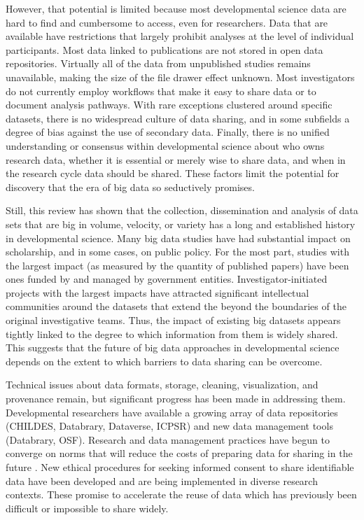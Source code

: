 \documentclass[letterpaper,man,apacite,natbib]{apa6}
\begin{document}
However, that potential is limited because most developmental science data are hard to find and cumbersome to access, even for researchers.
Data that are available have restrictions that largely prohibit analyses at the level of individual participants.
Most data linked to publications are not stored in open data repositories.
Virtually all of the data from unpublished studies remains unavailable, making the size of the file drawer effect unknown.
Most investigators do not currently employ workflows that make it easy to share data or to document analysis pathways.
With rare exceptions clustered around specific datasets, there is no widespread culture of data sharing, and in some subfields a degree of bias against the use of secondary data.
Finally, there is no unified understanding or consensus within developmental science about who owns research data, whether it is essential or merely wise to share data, and when in the research cycle data should be shared.
These factors limit the potential for discovery that the era of big data so seductively promises.

Still, this review has shown that the collection, dissemination and analysis of data sets that are big in volume, velocity, or variety has a long and established history in developmental science.
Many big data studies have had substantial impact on scholarship, and in some cases, on public policy.
For the most part, studies with the largest impact (as measured by the quantity of published papers) have been ones funded by and managed by government entities.
Investigator-initiated projects with the largest impacts have attracted significant intellectual communities around the datasets that extend the beyond the boundaries of the original investigative teams.
Thus, the impact of existing big datasets appears tightly linked to the degree to which information from them is widely shared.
This suggests that the future of big data approaches in developmental science depends on the extent to which barriers to data sharing can be overcome.

Technical issues about data formats, storage, cleaning, visualization, and provenance remain, but significant progress has been made in addressing them.
Developmental researchers have available a growing array of data repositories (CHILDES, Databrary, Dataverse, ICPSR) and new data management tools (Databrary, OSF).
Research and data management practices have begun to converge on norms that will reduce the costs of preparing data for sharing in the future \cite{goodman_ten_2014}.
New ethical procedures for seeking informed consent to share identifiable data have been developed and are being implemented in diverse research contexts.
These promise to accelerate the reuse of data which has previously been difficult or impossible to share widely.
\end{document}
